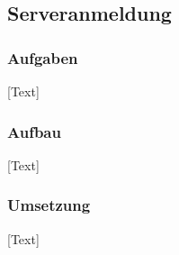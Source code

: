 
\subsection{Serveranmeldung}

\subsubsection{Aufgaben}
[Text]

\subsubsection{Aufbau}
[Text]

\subsubsection{Umsetzung}
[Text]


